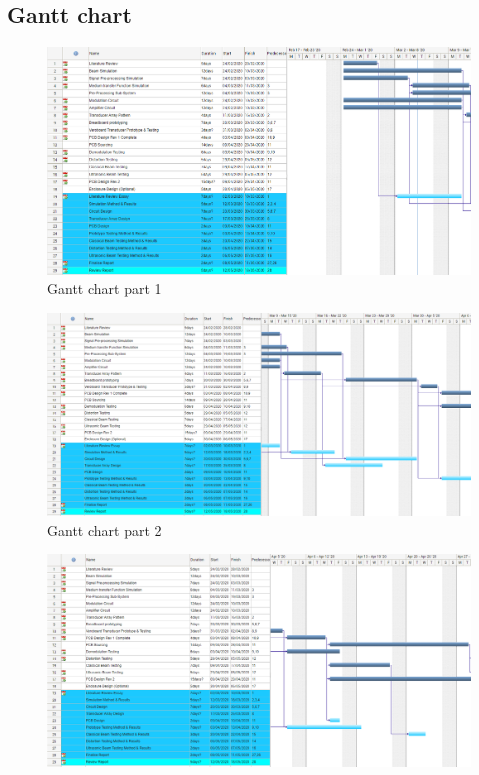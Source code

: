 \begin{appendices}
\subsection{Gantt chart}
\begin{figure}[h]
    \centering
    \includegraphics[width=\textwidth]{Figures/Gantt1.PNG}
    \caption{Gantt chart part 1}
    \label{fig:gantt1}
\end{figure}
\begin{figure}[h]
    \centering
    \includegraphics[width=\textwidth]{Figures/Gantt2.PNG}
    \caption{Gantt chart part 2}
    \label{fig:gantt2}
\end{figure}
\begin{figure}[h]
    \centering
    \includegraphics[width=\textwidth]{Figures/Gantt3.PNG}

\end{figure}
\end{appendices}
